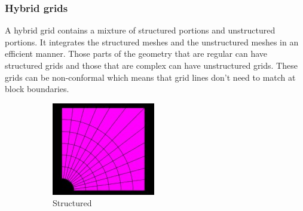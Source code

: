 \subsubsection{Hybrid grids}

A hybrid grid contains a mixture of structured portions and unstructured portions. It integrates the structured meshes and the unstructured meshes in an efficient manner. Those parts of the geometry that are regular can have structured grids and those that are complex can have unstructured grids. These grids can be non-conformal which means that grid lines don’t need to match at block boundaries.


\begin{figure}[h]
        \centering
        \begin{subfigure}[b]{0.3\textwidth}
                \includegraphics[width=\textwidth]{105.jpg}
                \caption{Structured}
                \label{fig:structured}
        \end{subfigure}%
        ~ %
        \begin{subfigure}[b]{0.3\textwidth}

\end{subfigure}
\end{figure}
